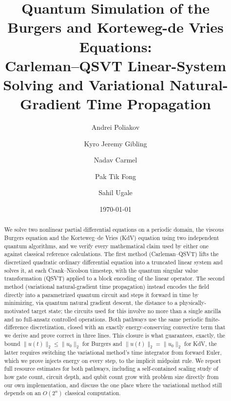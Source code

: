 \documentclass[aps,pra,twocolumn,notitlepage,superscriptaddress,floatfix,10pt]{revtex4-2}
\newcommand{\norm}[1]{\lVert #1 \rVert}
\begin{document}
\title{Quantum Simulation of the Burgers and Korteweg-de Vries Equations:\\
Carleman--QSVT Linear-System Solving and Variational Natural-Gradient Time Propagation}

\author{Andrei Poliakov}

\author{Kyro Jeremy Gibling}

\author{Nadav Carmel}

\author{Pak Tik Fong}

\author{Sahil Ugale}

\date{\today}

\begin{abstract}
We solve two nonlinear partial differential equations on a periodic domain, the viscous Burgers
equation and the Korteweg--de Vries (KdV) equation using two independent quantum algorithms, and
we verify every mathematical claim used by either one against classical reference calculations. The
first method (Carleman--QSVT) lifts the discretized quadratic ordinary differential equation into a
truncated linear system and solves it, at each Crank--Nicolson timestep, with the quantum singular
value transformation (QSVT) applied to a block encoding of the linear operator. The second method
(variational natural-gradient time propagation) instead encodes the field directly into a
parametrized quantum circuit and steps it forward in time by minimizing, via quantum natural gradient
descent, the distance to a physically-motivated target state; the circuits used for this involve no
more than a single ancilla and no full-ansatz controlled operations. Both pathways use the same
periodic finite-difference discretization, closed with an exactly energy-conserving convective term
that we derive and prove correct in three lines. This closure is what guarantees, exactly, the
bound $\norm{u(t)}_2\le\norm{u_0}_2$ for Burgers and $\norm{u(t)}_2=\norm{u_0}_2$ for KdV, the
latter requires switching the variational method's time integrator from forward Euler, which we prove
injects energy on every step, to the implicit midpoint rule. We report full resource estimates for
both pathways, including a self-contained scaling study of how gate count, circuit depth, and qubit
count grow with problem size directly from our own implementation, and discuss the one
place where the variational method still depends on an $O(2^n)$ classical computation.
\end{abstract}
\end{document}
